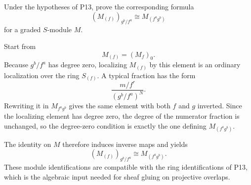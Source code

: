 \begin{problem}\label{prob:vi34-14}
Under the hypotheses of P13, prove the corresponding formula
\[
(M_{(f)})_{g^b/f^a}\cong M_{(f^ag^b)}
\]
for a graded \(S\)-module \(M\).

\end{problem}

\ifdefined\FullProblemDossiers
\begin{solution}
Start from
\[
M_{(f)}=(M_f)_0.
\]
Because \(g^b/f^a\) has degree zero, localizing \(M_{(f)}\) by this element is an ordinary localization over the
ring \(S_{(f)}\). A typical fraction has the form
\[
\frac{m/f^r}{(g^b/f^a)^N}.
\]
Rewriting it in \(M_{f^ag^b}\) gives the same element with both \(f\) and \(g\) inverted. Since the localizing
element has degree zero, the degree of the numerator fraction is unchanged, so the degree-zero condition is exactly
the one defining \(M_{(f^ag^b)}\).

The identity on \(M\) therefore induces inverse maps and yields
\[
\boxed{
(M_{(f)})_{g^b/f^a}\cong M_{(f^ag^b)}.
}
\]
These module identifications are compatible with the ring identifications of P13, which is the algebraic input
needed for sheaf gluing on projective overlaps.
\end{solution}
\fi
